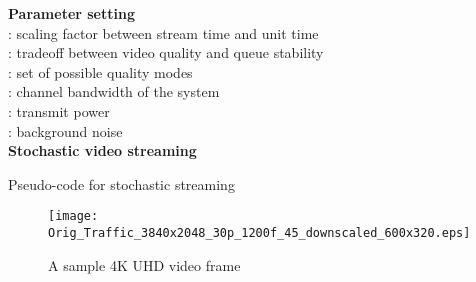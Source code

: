 \documentclass[conference]{IEEEtran}
\begin{document}
\begin{algorithm}[t!]
\SetAlgoLined
\textbf{Parameter setting} \\
 : scaling factor between stream time and unit time \\
 : tradeoff between video quality and queue stability \\
 : set of possible quality modes \\
 : channel bandwidth of the system \\
 : transmit power \\
 : background noise \\
\vspace{3mm}
\textbf{Stochastic video streaming} \\
\caption{Pseudo-code for stochastic streaming~\cite{ton2015kim}}
\label{algorithm-stochastic}
\end{algorithm}

\begin{figure*}[t!]
	\begin{center}
		\texttt{[image: Orig\_Traffic\_3840x2048\_30p\_1200f\_45\_downscaled\_600x320.eps]}
	\end{center}
	\caption{A sample 4K UHD video frame}
	\label{fig:original}
\end{figure*}
\end{document}
